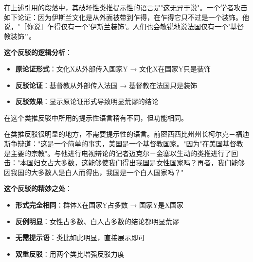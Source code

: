 \begin{examplebox}[title=文化论证的类推反驳案例]
在上述引用的段落中，其破坏性类推提示性的语言是"这无异于说"。一个学者攻击如下论证：因为伊斯兰文化是从外面被带到乍得，在乍得它只不过是一个装饰。他说，"［你说］乍得仅有一个'伊斯兰装饰'。人们也会敏锐地说法国仅有一个'基督教装饰'"。\cite{brenner1993}

\textbf{这个反驳的逻辑分析}：
\begin{itemize}
\item \textbf{原论证形式}：文化X从外部传入国家Y → 文化X在国家Y只是装饰
\item \textbf{反驳论证}：基督教从外部传入法国 → 基督教在法国只是装饰
\item \textbf{反驳效果}：显示原论证形式导致明显荒谬的结论
\end{itemize}

在这个类推反驳中所用的提示性语言稍有不同，但功能相同。
\end{examplebox}

\begin{examplebox}[title=政治论证的类推反驳案例]
在类推反驳很明显的地方，不需要提示性的语言。前密西西比州州长柯尔克－福迪斯争辩道："这是一个简单的事实，美国是一个基督教国家。"因为"在美国基督教是主要的宗教"。与他进行电视辩论的记者迈克尔－金塞以生动的类推进行了回击："本国妇女占大多数，这能够使我们得出我国是女性国家吗？再者，我们能够因我国的大多数人是白人而得出，我国是一个白人国家吗？"\cite{kinsley1992}

\textbf{这个反驳的精妙之处}：
\begin{itemize}
\item \textbf{形式完全相同}：群体X在国家Y占多数 → 国家Y是X国家
\item \textbf{反例明显}：女性占多数、白人占多数的结论都明显荒谬
\item \textbf{无需提示语}：类比如此明显，直接展示即可
\item \textbf{双重反驳}：用两个类比增强反驳力度
\end{itemize}
\end{examplebox}

